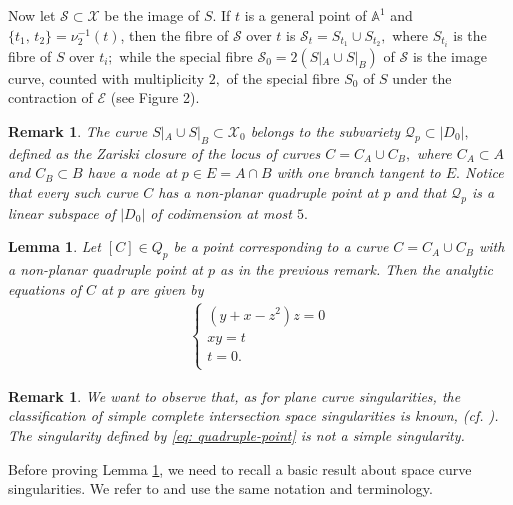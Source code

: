 \documentclass[plain]{amsart}
\newtheorem{lemma}[theorem]{\textbf{Lemma}}
\newtheorem{remark}[theorem]{\textbf{Remark}}
\begin{document}
\noindent Now let $\mathcal S\subset\mathcal X$ be the image of $S.$ If $t$ is a general point of 
$\mathbb A^1$ and $\{t_1, \,t_2\}=\nu_2^{-1}(t)$, then the fibre of $\mathcal S$ over
$t$ is $\mathcal S_t=S_{t_1}\cup S_{t_2},$ where $S_{t_i}$ is the 
fibre of $S$ over $t_i;$  while the special fibre $\mathcal S_0=2(S|_A\cup S|_B)$ of
$\mathcal S$ is the image curve, counted with multiplicity $2,$   of the special fibre $S_0$ of
$S$ under the contraction of $\mathcal E$ (see Figure 2). 
\begin{remark}
The curve $S|_A\cup S|_B\subset\mathcal X_0$ belongs to the subvariety  $\mathcal Q_p\subset |D_0|,$ defined 
as the Zariski closure of the locus of curves  
$C=C_A\cup C_B,$ where $C_A\subset A$ and $C_B\subset B$ have a node at 
$p\in E=A\cap B$ with one branch tangent to $E.$ 
Notice that every such curve $C$ has a non-planar quadruple point at $p$  and that $\mathcal Q_p$
is a linear subspace of $|D_0|$ of codimension at most $5.$
\end{remark} 

\begin{lemma}\label{lemma: analytic-type}
Let $[C]\in Q_p$ be a point corresponding to a curve $C=C_A\cup C_B$ with a non-planar 
quadruple point at $p$ as in the previous remark. Then the analytic equations
of $C$ at $p$ are given by 
\begin{eqnarray}\label{eq: quadruple-point}
\left\{\begin{array}{l}
(y+x-z^2)z=0\\
xy=t \\
t=0.\\
\end{array}\right.
\end{eqnarray}
\end{lemma}
\begin{remark}
We want to observe that, as for plane curve singularities, the classification of
simple complete intersection space singularities is known, (cf. \cite{giusti}).
The singularity defined by \eqref{eq: quadruple-point} is not a simple singularity. 
\end{remark}
Before proving Lemma \ref{lemma: analytic-type}, we need to recall  a basic result about
space curve singularities. We refer to \cite{giusti} and use the same notation and
terminology.
\end{document}
